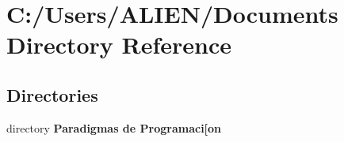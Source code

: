\section{C\+:/\+Users/\+A\+L\+I\+E\+N/\+Documents Directory Reference}
\label{dir_5e4373d2905ce1e03b0d15f2047f0a8d}
\subsection*{Directories}
\begin{DoxyCompactItemize}
\item 
directory {\bf Paradigmas de Programaci[on}
\end{DoxyCompactItemize}
